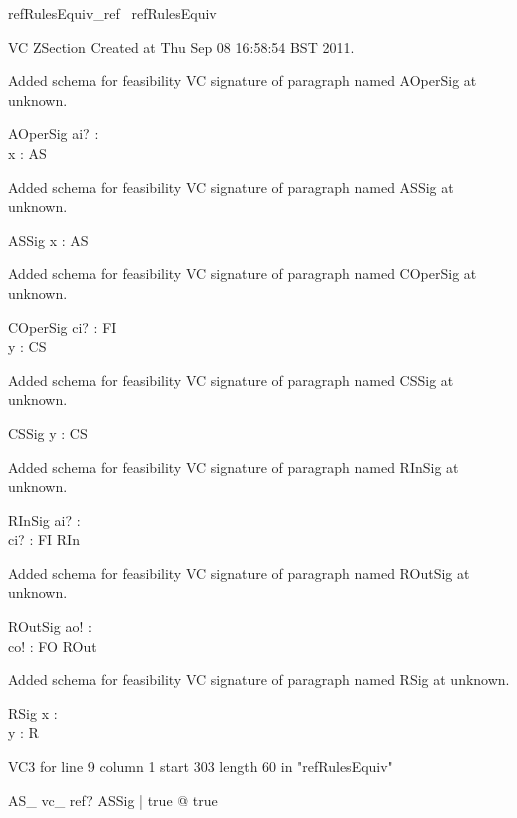 \documentclass{article}
\begin{document}

\begin{zsection}	 \SECTION refRulesEquiv\_ref \parents~refRulesEquiv
\end{zsection}

VC ZSection Created at Thu Sep 08 16:58:54 BST 2011.


Added schema for feasibility VC signature of paragraph named AOperSig at unknown.
\begin{schema}{AOperSig}
ai? : \nat \\
 x : \power \nat 
\where
 AS
\end{schema}


Added schema for feasibility VC signature of paragraph named ASSig at unknown.
\begin{schema}{ASSig}
x : \power \nat 
\where
 AS
\end{schema}


Added schema for feasibility VC signature of paragraph named COperSig at unknown.
\begin{schema}{COperSig}
ci? : FI \\
 y : \seq \nat 
\where
 CS
\end{schema}


Added schema for feasibility VC signature of paragraph named CSSig at unknown.
\begin{schema}{CSSig}
y : \seq \nat 
\where
 CS
\end{schema}


Added schema for feasibility VC signature of paragraph named RInSig at unknown.
\begin{schema}{RInSig}
ai? : \nat \\
 ci? : FI 
\where
 RIn
\end{schema}


Added schema for feasibility VC signature of paragraph named ROutSig at unknown.
\begin{schema}{ROutSig}
ao! : \nat \\
 co! : FO 
\where
 ROut
\end{schema}


Added schema for feasibility VC signature of paragraph named RSig at unknown.
\begin{schema}{RSig}
x : \power \nat \\
 y : \seq \nat 
\where
 R
\end{schema}

VC3 for line 9 column 1 start 303 length 60 in "refRulesEquiv"
\begin{theorem}{AS\_ vc\_ ref}\vdash ? \exists ASSig | true @ true
\end{theorem}
\end{document}
